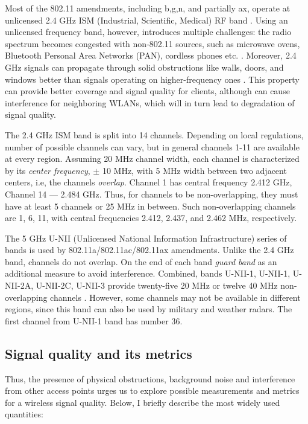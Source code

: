 Most of the 802.11 amendments, including b,g,n, and partially ax, operate at unlicensed 2.4 GHz ISM (Industrial, Scientific, Medical) RF band \cite{tanenbaumComputerNetworks2020, colemanCWNACertifiedWireless2021}. Using an unlicensed frequency band, however, introduces multiple challenges: the radio spectrum becomes congested with non-802.11 sources, such as microwave ovens, Bluetooth Personal Area Networks (PAN), cordless phones etc. \cite{tanenbaumComputerNetworks2020, colemanCWNACertifiedWireless2021}. Moreover, 2.4 GHz signals can propagate through solid obstructions like walls, doors, and windows better than signals operating on higher-frequency ones \cite{colemanCWNACertifiedWireless2021}. This property can provide better coverage and signal quality for clients, although can cause interference for neighboring WLANs, which will in turn lead to degradation of signal quality.

The 2.4 GHz ISM band is split into 14 channels. Depending on local regulations, number of possible channels can vary, but in general channels 1-11 are available at every region. Assuming 20 MHz channel width, each channel is characterized by its \textit{center frequency}, $\pm$ 10 MHz, with 5 MHz width between two adjacent centers, i.e, the channels \textit{overlap}. Channel 1 has central frequency 2.412 GHz, Channel 14 — 2.484 GHz. Thus, for channels to be non-overlapping, they must have at least 5 channels or 25 MHz in between. Such non-overlapping channels are 1, 6, 11, with central frequencies 2.412, 2.437, and 2.462 MHz, respectively.

The 5 GHz U-NII (Unlicensed National Information Infrastructure) series of bands is used by 802.11a/802.11ac/802.11ax amendments. Unlike the 2.4 GHz band, channels do not overlap. On the end of each band \textit{guard band} as an additional measure to avoid interference. Combined, bands U-NII-1, U-NII-1, U-NII-2A, U-NII-2C, U-NII-3 provide twenty-five 20 MHz or twelve 40 MHz non-overlapping channels \cite{colemanCWNACertifiedWireless2021}. However, some channels may not be available in different regions, since this band can also be used by military and weather radars. The first channel from U-NII-1 band has number 36.


\subsection{Signal quality and its metrics}

Thus, the presence of physical obstructions, background noise and interference from other access points urges us to explore possible measurements and metrics for a wireless signal quality. Below, I briefly describe the most widely used quantities:

